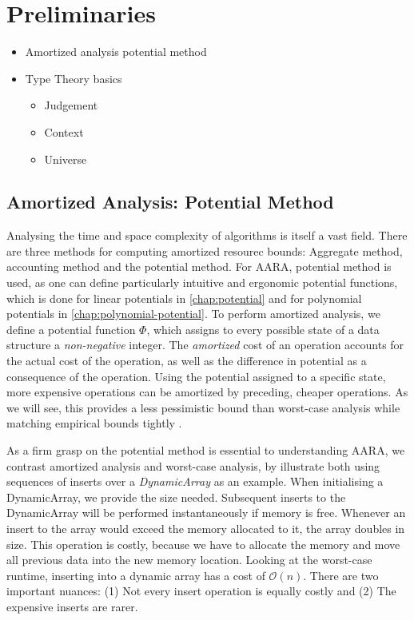 \chapter{Preliminaries} \label{chap:preliminaries}

\begin{itemize}
	\item Amortized analysis potential method
	\item Type Theory basics
	   \begin{itemize}
	   	\item Judgement 
		\item Context
		\item Universe
	   \end{itemize}
\end{itemize}

\section{Amortized Analysis: Potential Method}
Analysing the time and space complexity of algorithms is itself a vast field. There are three methods for computing amortized resourec bounds: Aggregate method, accounting method and the potential method. For AARA, potential method is used, as one can define particularly intuitive and ergonomic potential functions, which is done for linear potentials in \ref{chap:potential} and for polynomial potentials in \ref{chap:polynomial-potential}.
To perform amortized analysis, we define a potential function \(\Phi\), which assigns to every possible state of a data structure a \emph{non-negative} integer. The \emph{amortized} cost of an operation accounts for the actual cost of the operation, as well as the difference in potential as a consequence of the operation. Using the potential assigned to a specific state, more expensive operations can be amortized by preceding, cheaper operations. As we will see, this provides a less pessimistic bound than worst-case analysis while matching empirical bounds tightly . 

As a firm grasp on the potential method is essential to understanding AARA, we contrast amortized analysis and worst-case analysis, by illustrate both using sequences of inserts over a \emph{DynamicArray} as an example. 
When initialising a DynamicArray, we provide the size needed. Subsequent inserts to the DynamicArray will be performed instantaneously if memory is free. Whenever an insert to the array would exceed the memory allocated to it, the array doubles in size.
This operation is costly, because we have to allocate the memory and move all previous data into the new memory location. Looking at the worst-case runtime, inserting into a dynamic array has a cost of \(\mathcal{O}(n)\). There are two important nuances: (1) Not every insert operation is equally costly and (2) The expensive inserts are rarer.

